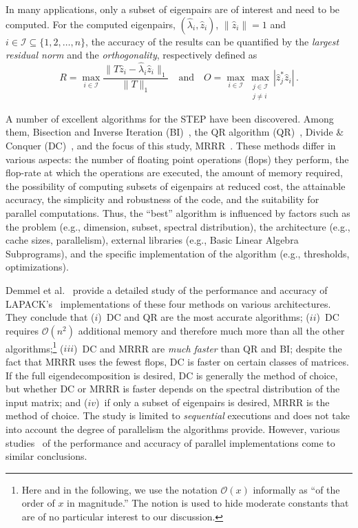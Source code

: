 \documentclass[final]{siamltex}
\newcommand\norm[1]{\lVert#1\rVert}
\newcommand\order[1]{\mathcal{O}(#1)}
\begin{document}
In many applications, only a subset of eigenpairs are of interest and need
to be computed. 
For the computed eigenpairs,
$(\hat{\lambda}_i, \hat{z}_i)$, $\norm{\hat{z}_i} = 1$ and $i \in \mathcal{I}
\subseteq \{1,2,\ldots,n\}$, the accuracy of the
results can be quantified by 
the {\it largest residual norm} and the {\it orthogonality}, 
respectively defined as 
\begin{equation}
  R = \max_{i \in \mathcal{I}} \frac{\| T \hat{z}_i - \hat{\lambda}_i \hat{z}_i
    \|_1}{\| T \|_1} \quad \mbox{and} \quad
  O = \max_{i \in \mathcal{I}} \max_{\substack{ j \in \mathcal{I} \\ j \neq i }} | \hat{z}_j^* \hat{z}_i | \label{def:defresortho}
  \,.
\end{equation}

A number of excellent algorithms for the STEP have been discovered. Among them,
Bisection and Inverse Iteration (BI)~\cite{Dhillon98currentinverse,Ipsen:1997:Invit},
the QR algorithm (QR)~\cite{qr61a,qr61b},  
Divide \& Conquer (DC)~\cite{dc81,dc94,dc95}, and the focus of this study,
MRRR~\cite{Dhillon:Diss,Dhillon:2004:Ortvecs,Dhillon:2004:MRRR,Fernando97,Parlett2000121,Willems:Diss}.  
These methods differ in various aspects: the number of floating point operations (flops)
they perform, the flop-rate at 
which the operations are executed, the amount of memory required, the
possibility of computing subsets 
of eigenpairs at reduced cost, the attainable accuracy, the simplicity and
robustness of the code, and the suitability for parallel computations.
Thus, the ``best'' algorithm is influenced by factors such as the problem
(e.g., dimension, subset, spectral distribution), the 
architecture (e.g., cache sizes, parallelism), external
libraries (e.g., Basic Linear Algebra Subprograms), and the specific
implementation of the algorithm (e.g., thresholds, optimizations). 

Demmel et al.~\cite{perf09} provide a detailed study of the performance and
accuracy of LAPACK's~\cite{laug} 
implementations of these four methods on various
architectures. They conclude that
($i$)~DC and QR are the most accurate
algorithms; ($ii$)~DC requires $\order{n^2}$ additional memory and therefore
much more than all 
the other algorithms;\footnote{Here and in the following, we use the notation
  $\order{x}$ informally as ``of the order of $x$ in magnitude.'' The notion
is used to hide moderate constants that are of no particular interest to our
discussion.} ($iii$)~DC and MRRR are {\em much faster} than QR and BI;
despite the fact that MRRR uses the fewest flops, DC is faster on certain classes of
matrices. If the full eigendecomposition is desired, DC is generally the method of
choice, but whether DC or MRRR is faster depends on the spectral distribution
of the input matrix; and ($iv$)~if only a subset of eigenpairs is desired, 
MRRR is the method of choice. 
The study is limited to {\it sequential} executions and does not take
into account the degree of parallelism the algorithms provide. However, various
studies~\cite{Bientinesi:2005:PMR3,Vomel:2010:ScaLAPACKsMRRR,EleMRRR,Tisseur:1999:PDC,mr3smp} of the performance and 
accuracy of parallel implementations come to similar conclusions.
\end{document}
